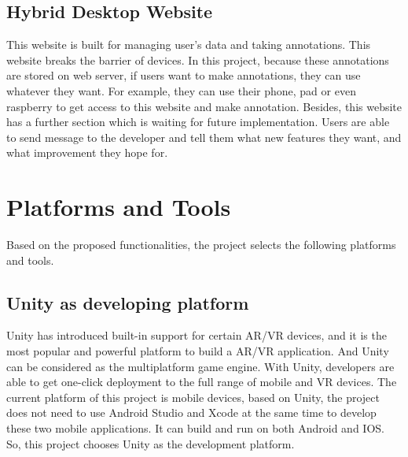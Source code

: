 \subsection{Hybrid Desktop Website}
This website is built for managing user’s data and taking annotations. This website breaks the barrier of devices. In this project, because these annotations are stored on web server, if users want to make annotations, they can use whatever they want. For example, they can use their phone, pad or even raspberry to get access to this website and make annotation. Besides, this website has a further section which is waiting for future implementation. Users are able to send message to the developer and tell them what new features they want, and what improvement they hope for.

\section{Platforms and Tools}
Based on the proposed functionalities, the project selects the following platforms and tools.
\subsection{Unity as developing platform}
Unity has introduced built-in support for certain AR/VR devices, and it is the most popular and powerful platform to build a AR/VR application. And Unity can be considered as the multiplatform game engine. With Unity, developers are able to get one-click deployment to the full range of mobile and VR devices. The current platform of this project is mobile devices, based on Unity, the project does not need to use Android Studio and Xcode at the same time to develop these two mobile applications. It can build and run on both Android and IOS. So, this project chooses Unity as the development platform.
 
